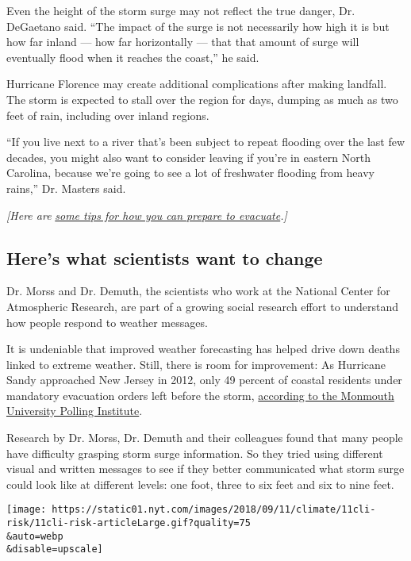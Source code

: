 Even the height of the storm surge may not reflect the true danger, Dr.
DeGaetano said. ``The impact of the surge is not necessarily how high it
is but how far inland --- how far horizontally --- that that amount of
surge will eventually flood when it reaches the coast,'' he said.

Hurricane Florence may create additional complications after making
landfall. The storm is expected to stall over the region for days,
dumping as much as two feet of rain, including over inland regions.

``If you live next to a river that's been subject to repeat flooding
over the last few decades, you might also want to consider leaving if
you're in eastern North Carolina, because we're going to see a lot of
freshwater flooding from heavy rains,'' Dr. Masters said.

\emph{{[}Here are}
\href{https://www.nytimes.com/2018/09/11/us/hurricane-preparedness-evacuation.html}{\emph{some
tips for how you can prepare to evacuate}}\emph{.{]}}

\hypertarget{heres-what-scientists-want-to-change}{%
\subsection{Here's what scientists want to
change}\label{heres-what-scientists-want-to-change}}

Dr. Morss and Dr. Demuth, the scientists who work at the National Center
for Atmospheric Research, are part of a growing social research effort
to understand how people respond to weather messages.

It is undeniable that improved weather forecasting has helped drive down
deaths linked to extreme weather. Still, there is room for improvement:
As Hurricane Sandy approached New Jersey in 2012, only 49 percent of
coastal residents under mandatory evacuation orders left before the
storm,
\href{https://www.monmouth.edu/polling-institute/documents/monmouthpoll_njsandycoast_050713.pdf/}{according
to the Monmouth University Polling Institute}.

Research by Dr. Morss, Dr. Demuth and their colleagues found that many
people have difficulty grasping storm surge information. So they tried
using different visual and written messages to see if they better
communicated what storm surge could look like at different levels: one
foot, three to six feet and six to nine feet.

\texttt{[image: https://static01.nyt.com/images/2018/09/11/climate/11cli-risk/11cli-risk-articleLarge.gif?quality=75\\\&auto=webp\\\&disable=upscale]}

